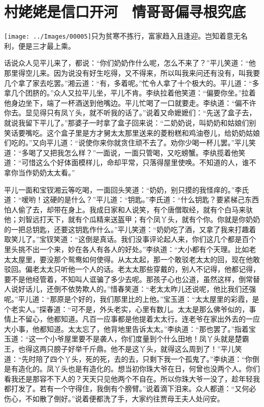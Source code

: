 

\chapter{村姥姥是信口开河　情哥哥偏寻根究底}\label{part0043_split_000.htmlux5cux23calibre_pb_0}

{\texttt{[image: ../Images/00005]}只为贫寒不拣行，富家趋入且逢迎。岂知着意无名利，便是三才最上乘。}

话说众人见平儿来了，都说：``你们奶奶作什么呢，怎么不来了？''平儿笑道：``他那里得空儿来。因为说没有好生吃得，又不得来，所以叫我来问还有没有，叫我要几个拿了家去吃罢。''湘云道：``有，多着呢。''忙令人拿了十个极大的。平儿道：``多拿几个团脐的。''众人又拉平儿坐，平儿不肯。李纨拉着他笑道：``偏要你坐。''拉着他身边坐下，端了一杯酒送到他嘴边。平儿忙喝了一口就要走。李纨道：``偏不许你去。显见得只有凤丫头，就不听我的话了。''说着又命嬷嬷们：``先送了盒子去，就说我留下平儿了。''那婆子一时拿了盒子回来说：``二奶奶说，叫奶奶和姑娘们别笑话要嘴吃。这个盒子里是方才舅太太那里送来的菱粉糕和鸡油卷儿，给奶奶姑娘们吃的。''又向平儿道：``说使你来你就贪住顽不去了。劝你少喝一杯儿罢。''平儿笑道：``多喝了又把我怎么样？''一面说，一面只管喝，又吃螃蟹。李纨揽着他笑道：``可惜这么个好体面模样儿，命却平常，只落得屋里使唤。不知道的人，谁不拿你当作奶奶太太看。''

平儿一面和宝钗湘云等吃喝，一面回头笑道：``奶奶，别只摸的我怪痒的。''李氏道：``嗳哟！这硬的是什么？''平儿道：``钥匙。''李氏道：``什么钥匙？要紧梯己东西怕人偷了去，却带在身上。我成日家和人说笑，有个唐僧取经，就有个白马来驮他；刘智远打天下，就有个瓜精来送盔甲；有个凤丫头，就有个你。你就是你奶奶的一把总钥匙，还要这钥匙作什么。''平儿笑道：``奶奶吃了酒，又拿了我来打趣着取笑儿了。''宝钗笑道：``这倒是真话。我们没事评论起人来，你们这几个都是百个里头挑不出一个来，妙在各人有各人的好处。''李纨道：``大小都有个天理。比如老太太屋里，要没那个鸳鸯如何使得。从太太起，那一个敢驳老太太的回，现在他敢驳回。偏老太太只听他一个人的话。老太太那些穿戴的，别人不记得，他都记得，要不是他经管着，不知叫人诓骗了多少去呢。那孩子心也公道，虽然这样，倒常替人说好话儿，还倒不依势欺人的。''惜春笑道：``老太太昨儿还说呢，他比我们还强呢。''平儿道：``那原是个好的，我们那里比的上他。''宝玉道：``太太屋里的彩霞，是个老实人。''探春道：``可不是，外头老实，心里有数儿。太太是那么佛爷似的，事情上不留心，他都知道。凡百一应事都是他提着太太行。连老爷在家出外去的一应大小事，他都知道。太太忘了，他背地里告诉太太。''李纨道：``那也罢了。''指着宝玉道：``这一个小爷屋里要不是袭人，你们度量到个什么田地！凤丫头就是楚霸王，也得这两只膀子好举千斤鼎。他不是这丫头，就得这么周到了！''平儿笑道：``先时陪了四个丫头，死的死，去的去，只剩下我一个孤鬼了。''李纨道：``你倒是有造化的。凤丫头也是有造化的。想当初你珠大爷在日，何曾也没两个人。你们看我还是那容不下人的？天天只见他两个不自在。所以你珠大爷一没了，趁年轻我都打发了。若有一个守得住，我倒有个膀臂。''说着滴下泪来。众人都道：``又何必伤心，不如散了倒好。''说着便都洗了手，大家约往贾母王夫人处问安。

